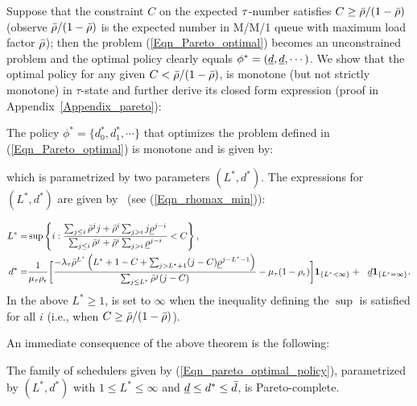    
Suppose that the constraint $C$ on the expected ${\tau}$-number satisfies
$C \ge {\bar \rho} / (1-{\bar \rho})$ (observe ${\bar \rho} / (1-{\bar \rho})$ is the expected number
in M/M/1 queue with maximum load factor ${\bar \rho}$);
then the problem (\ref{Eqn_Pareto_optimal}) becomes an unconstrained
problem and the optimal policy clearly equals $\phi^*= ({\underline d}, {\underline d},
\cdots)$.  We show that the optimal policy for any given $C < {\bar \rho} /
(1-{\bar \rho})$, is monotone (but not strictly monotone) in $\tau$-state and further derive its closed
form expression (proof in Appendix~\ref{Appendix_pareto}):
\begin{thm}
\label{Thm_Opt_Policy} 
The  policy $\phi^* = \{d_0^*, d_1^* ,  \cdots\}$ that optimizes the   problem defined in (\ref{Eqn_Pareto_optimal})  is monotone and is given by:

which is parametrized by two parameters $(L^*, d^*)$. The  expressions for $(L^*, d^*)$ are given by 
~(see (\ref{Eqn_rhomax_min})):

\vspace{-6mm}
{\small \begin{align*}
L^*  
=&  \sup \left  \{ i :  \frac {  \sum_{j \le i}  \rmax^j j +    \rmax^i    \sum_{j > i} j \rmin^{j-i} }{
\sum_{j \le i} \rmax^j  +    \rmax^i    \sum_{j > i}  \rmin^{j-i}
} < C \right  \},   \\
%
 d^* =& \frac{1}{\mu_\tau \rho_\epsilon}\bigg[ \frac{- \lambda_\tau   \rmax^{L^*}    \left  (L^*+1 - C +   \sum_{j > L^*+1} (j -C )\rmin^{j-L^*-1}  \right )}{ \sum_{j \le L^*}  \rmax^j ( j - C) }  - \mu_\tau(1 - \rho_\epsilon) \bigg]  \indicator{L^* < \infty } + \ \     \underline{d} \indicator{L^* = \infty }.
\end{align*}}In the above $L^* \ge 1$,  is set to  $\infty$ when the inequality defining the $\sup$ is satisfied for all $i$ (i.e., when $C \ge {\bar \rho} /
(1-{\bar \rho})$). 

\end{thm}
%
%
An immediate consequence of the above theorem is the following:
\begin{cor}
	The family of schedulers given by (\ref{Eqn_pareto_optimal_policy}), parametrized by $(L^*, d^*)$ with $1 \le L^* \le \infty $ and
${\underline d} \le d^* \le {\bar d}$, 
is  Pareto-complete.  
\end{cor}

